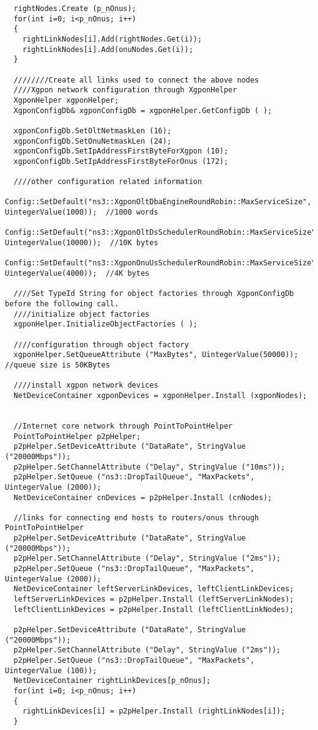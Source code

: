 \begin{lstlisting}
  rightNodes.Create (p_nOnus);
  for(int i=0; i<p_nOnus; i++)
  {
    rightLinkNodes[i].Add(rightNodes.Get(i));
    rightLinkNodes[i].Add(onuNodes.Get(i));
  }

  ////////Create all links used to connect the above nodes
  ////Xgpon network configuration through XgponHelper
  XgponHelper xgponHelper;
  XgponConfigDb& xgponConfigDb = xgponHelper.GetConfigDb ( );

  xgponConfigDb.SetOltNetmaskLen (16);
  xgponConfigDb.SetOnuNetmaskLen (24);
  xgponConfigDb.SetIpAddressFirstByteForXgpon (10);
  xgponConfigDb.SetIpAddressFirstByteForOnus (172);

  ////other configuration related information
  Config::SetDefault("ns3::XgponOltDbaEngineRoundRobin::MaxServiceSize", UintegerValue(1000));  //1000 words
  Config::SetDefault("ns3::XgponOltDsSchedulerRoundRobin::MaxServiceSize", UintegerValue(10000));  //10K bytes
  Config::SetDefault("ns3::XgponOnuUsSchedulerRoundRobin::MaxServiceSize", UintegerValue(4000));  //4K bytes

  ////Set TypeId String for object factories through XgponConfigDb before the following call.
  ////initialize object factories
  xgponHelper.InitializeObjectFactories ( );

  ////configuration through object factory
  xgponHelper.SetQueueAttribute ("MaxBytes", UintegerValue(50000));  //queue size is 50KBytes

  ////install xgpon network devices
  NetDeviceContainer xgponDevices = xgponHelper.Install (xgponNodes);


  //Internet core network through PointToPointHelper
  PointToPointHelper p2pHelper;
  p2pHelper.SetDeviceAttribute ("DataRate", StringValue ("20000Mbps"));
  p2pHelper.SetChannelAttribute ("Delay", StringValue ("10ms"));
  p2pHelper.SetQueue ("ns3::DropTailQueue", "MaxPackets", UintegerValue (2000));
  NetDeviceContainer cnDevices = p2pHelper.Install (cnNodes);

  //links for connecting end hosts to routers/onus through PointToPointHelper
  p2pHelper.SetDeviceAttribute ("DataRate", StringValue ("20000Mbps"));
  p2pHelper.SetChannelAttribute ("Delay", StringValue ("2ms"));
  p2pHelper.SetQueue ("ns3::DropTailQueue", "MaxPackets", UintegerValue (2000));
  NetDeviceContainer leftServerLinkDevices, leftClientLinkDevices;
  leftServerLinkDevices = p2pHelper.Install (leftServerLinkNodes);
  leftClientLinkDevices = p2pHelper.Install (leftClientLinkNodes);

  p2pHelper.SetDeviceAttribute ("DataRate", StringValue ("20000Mbps"));
  p2pHelper.SetChannelAttribute ("Delay", StringValue ("2ms"));
  p2pHelper.SetQueue ("ns3::DropTailQueue", "MaxPackets", UintegerValue (100));
  NetDeviceContainer rightLinkDevices[p_nOnus];
  for(int i=0; i<p_nOnus; i++)
  {
    rightLinkDevices[i] = p2pHelper.Install (rightLinkNodes[i]);
  }


\end{lstlisting}
